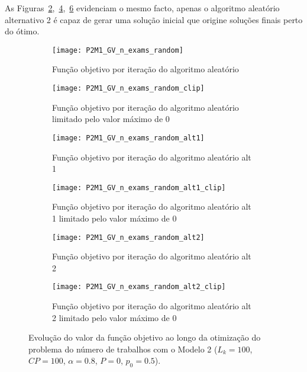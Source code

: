 As Figuras~\ref{fig:P2M1_GV_n_exams_random_clip},~\ref{fig:P2M1_GV_n_exams_random_alt1_clip},~\ref{fig:P2M1_GV_n_exams_random_alt2_clip} evidenciam o mesmo facto, apenas o algoritmo aleatório alternativo 2 é capaz de gerar uma solução inicial que origine soluções finais perto do ótimo.\\
\begin{figure}[H]
    \centering
    \begin{subfigure}{0.49\textwidth}
        \centering
        \texttt{[image: P2M1\_GV\_n\_exams\_random]}
        \caption{Função objetivo por iteração do algoritmo aleatório}
        \label{fig:P2M1_GV_n_exams_random}
    \end{subfigure}
    \hfill
    \begin{subfigure}{0.49\textwidth}
        \centering
        \texttt{[image: P2M1\_GV\_n\_exams\_random\_clip]}
        \caption{Função objetivo por iteração do algoritmo aleatório limitado pelo valor máximo de 0}
        \label{fig:P2M1_GV_n_exams_random_clip}
    \end{subfigure}
    
    \begin{subfigure}{0.49\textwidth}
        \centering
        \texttt{[image: P2M1\_GV\_n\_exams\_random\_alt1]}
        \caption{Função objetivo por iteração do algoritmo aleatório alt 1}
        \label{fig:P2M1_GV_n_exams_random_alt1}
    \end{subfigure}
    \hfill
    \begin{subfigure}{0.49\textwidth}
        \centering
        \texttt{[image: P2M1\_GV\_n\_exams\_random\_alt1\_clip]}
        \caption{Função objetivo por iteração do algoritmo aleatório alt 1 limitado pelo valor máximo de 0}
        \label{fig:P2M1_GV_n_exams_random_alt1_clip}
    \end{subfigure}
    
    \begin{subfigure}{0.49\textwidth}
        \centering
        \texttt{[image: P2M1\_GV\_n\_exams\_random\_alt2]}
        \caption{Função objetivo por iteração do algoritmo aleatório alt 2}
        \label{fig:P2M1_GV_n_exams_random_alt2}
    \end{subfigure}
    \hfill
    \begin{subfigure}{0.49\textwidth}
        \centering
        \texttt{[image: P2M1\_GV\_n\_exams\_random\_alt2\_clip]}
        \caption{Função objetivo por iteração do algoritmo aleatório alt 2 limitado pelo valor máximo de 0}
        \label{fig:P2M1_GV_n_exams_random_alt2_clip}
    \end{subfigure}
    \caption{Evolução do valor da função objetivo ao longo da otimização do problema do número de trabalhos com o Modelo 2 ($L_{k}=100$, $CP=100$, $\alpha=0.8$, $P=0$, $p_{0}=0.5$).}
    \label{fig:P2M1_GV_dif_sol_ini}
\end{figure}

